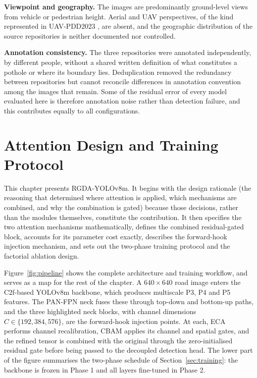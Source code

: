 \documentclass[MScCS]{uccthesis}
\begin{document}
\textbf{Viewpoint and geography.} The images are predominantly ground-level
views from vehicle or pedestrian height. Aerial and UAV perspectives, of the
kind represented in UAV-PDD2023 \parencite{pan2025realtime}, are absent, and
the geographic distribution of the source repositories is neither documented
nor controlled.

\textbf{Annotation consistency.} The three repositories were annotated
independently, by different people, without a shared written definition of
what constitutes a pothole or where its boundary lies. Deduplication removed
the redundancy between repositories but cannot reconcile differences in
annotation convention among the images that remain. Some of the residual error
of every model evaluated here is therefore annotation noise rather than
detection failure, and this contributes equally to all configurations.



\chapter{Attention Design and Training Protocol}
\label{ch:method}

This chapter presents RGDA-YOLOv8m. It begins with the design rationale (the reasoning that determined where attention is applied, which mechanisms are
combined, and why the combination is gated) because those decisions, rather
than the modules themselves, constitute the contribution. It then specifies the
two attention mechanisms mathematically, defines the combined residual-gated
block, accounts for its parameter cost exactly, describes the forward-hook
injection mechanism, and sets out the two-phase training protocol and the
factorial ablation design.

Figure~\ref{fig:pipeline} shows the complete architecture and training
workflow, and serves as a map for the rest of the chapter. A $640 \times 640$
road image enters the C2f-based YOLOv8m backbone, which produces multiscale P3,
P4 and P5 features. The PAN-FPN neck fuses these through top-down and bottom-up
paths, and the three highlighted neck blocks, with channel dimensions
$C \in \{192, 384, 576\}$, are the forward-hook injection points. At each, ECA
performs channel recalibration, CBAM applies its channel and spatial gates, and
the refined tensor is combined with the original through the zero-initialised
residual gate before being passed to the decoupled detection head. The lower
part of the figure summarises the two-phase schedule of
Section~\ref{sec:training}: the backbone is frozen in Phase 1 and all layers
fine-tuned in Phase 2.
\end{document}
